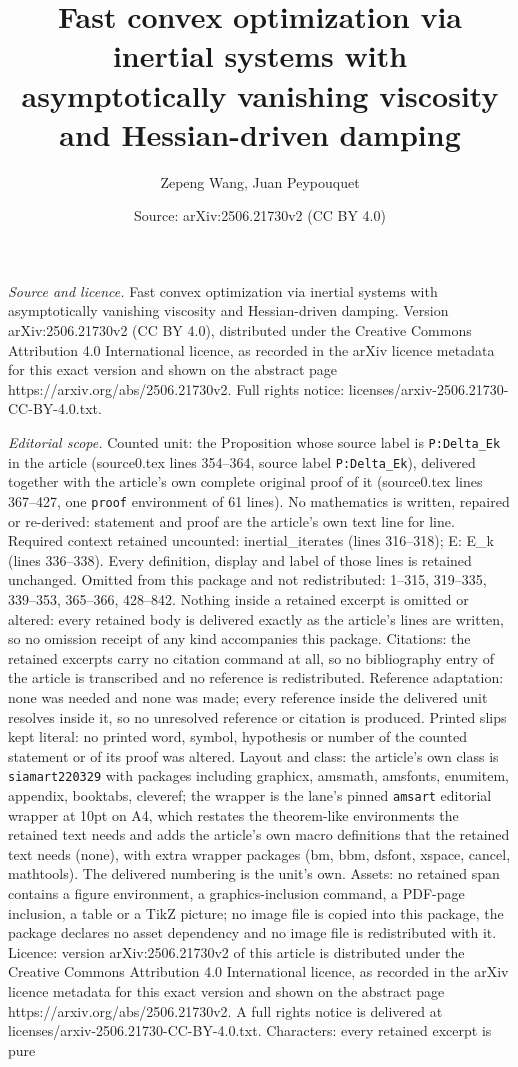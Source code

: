 \documentclass[10pt,a4paper]{amsart}
\title[Fast convex optimization via inertial systems with asymptoti]{Fast convex optimization via inertial systems with asymptotically vanishing viscosity and Hessian-driven damping}
\author{Zepeng Wang, Juan Peypouquet}
\date{Source: arXiv:2506.21730v2 (CC BY 4.0)}
\begin{document}
\maketitle

\noindent\emph{Source and licence.} Fast convex optimization via inertial systems with asymptotically vanishing viscosity and Hessian-driven damping. Version arXiv:2506.21730v2 (CC BY 4.0), distributed under the Creative Commons Attribution 4.0 International licence, as recorded in the arXiv licence metadata for this exact version and shown on the abstract page https://arxiv.org/abs/2506.21730v2. Full rights notice: licenses/arxiv-2506.21730-CC-BY-4.0.txt.\par\smallskip

\noindent\textit{Editorial scope.} Counted unit: the Proposition whose source label is \texttt{P:Delta\_Ek} in the article (source0.tex lines 354--364, source label \texttt{P:Delta\_Ek}), delivered together with the article's own complete original proof of it (source0.tex lines 367--427, one \texttt{proof} environment of 61 lines). No mathematics is written, repaired or re-derived: statement and proof are the article's own text line for line. Required context retained uncounted: inertial\_iterates (lines 316--318); E: E\_k (lines 336--338). Every definition, display and label of those lines is retained unchanged. Omitted from this package and not redistributed: 1--315, 319--335, 339--353, 365--366, 428--842. Nothing inside a retained excerpt is omitted or altered: every retained body is delivered exactly as the article's lines are written, so no omission receipt of any kind accompanies this package. Citations: the retained excerpts carry no citation command at all, so no bibliography entry of the article is transcribed and no reference is redistributed. Reference adaptation: none was needed and none was made; every reference inside the delivered unit resolves inside it, so no unresolved reference or citation is produced. Printed slips kept literal: no printed word, symbol, hypothesis or number of the counted statement or of its proof was altered. Layout and class: the article's own class is \texttt{siamart220329} with packages including graphicx, amsmath, amsfonts, enumitem, appendix, booktabs, cleveref; the wrapper is the lane's pinned \texttt{amsart} editorial wrapper at 10pt on A4, which restates the theorem-like environments the retained text needs and adds the article's own macro definitions that the retained text needs (none), with extra wrapper packages (bm, bbm, dsfont, xspace, cancel, mathtools). The delivered numbering is the unit's own. Assets: no retained span contains a figure environment, a graphics-inclusion command, a PDF-page inclusion, a table or a TikZ picture; no image file is copied into this package, the package declares no asset dependency and no image file is redistributed with it. Licence: version arXiv:2506.21730v2 of this article is distributed under the Creative Commons Attribution 4.0 International licence, as recorded in the arXiv licence metadata for this exact version and shown on the abstract page https://arxiv.org/abs/2506.21730v2. A full rights notice is delivered at licenses/arxiv-2506.21730-CC-BY-4.0.txt. Characters: every retained excerpt is pure 
\end{document}
